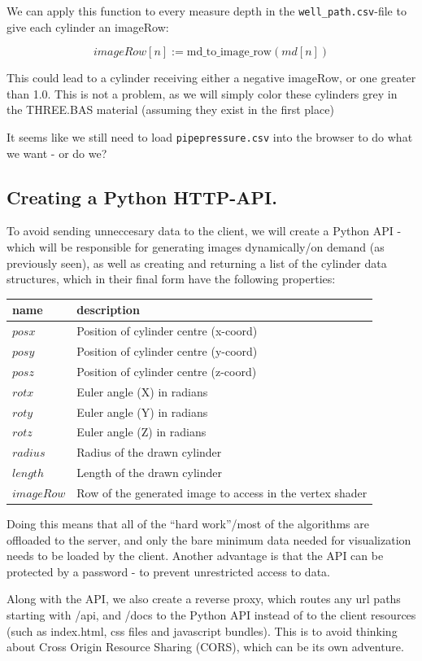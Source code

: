 We can apply this function to every measure depth in the
\texttt{well\_path.csv}-file to give each cylinder an imageRow:

\[
imageRow[n] := \text{md\_to\_image\_row}(md[n])
\]

This could lead to a cylinder receiving either a negative imageRow, or
one greater than 1.0. This is not a problem, as we will simply color
these cylinders grey in the THREE.BAS material (assuming they exist in
the first place)

It seems like we still need to load \texttt{pipepressure.csv} into the
browser to do what we want - or do we?

\hypertarget{creating-a-python-http-api.}{%
\subsection{Creating a Python
HTTP-API.}\label{creating-a-python-http-api.}}

To avoid sending unneccesary data to the client, we will create a Python
API - which will be responsible for generating images dynamically/on
demand (as previously seen), as well as creating and returning a list of
the cylinder data structures, which in their final form have the
following properties:

\begin{longtable}[]{@{}ll@{}}
\toprule
name & description\tabularnewline
\midrule
\endhead
\(posx\) & Position of cylinder centre (x-coord)\tabularnewline
\(posy\) & Position of cylinder centre (y-coord)\tabularnewline
\(posz\) & Position of cylinder centre (z-coord)\tabularnewline
\(rotx\) & Euler angle (X) in radians\tabularnewline
\(roty\) & Euler angle (Y) in radians\tabularnewline
\(rotz\) & Euler angle (Z) in radians\tabularnewline
\(radius\) & Radius of the drawn cylinder\tabularnewline
\(length\) & Length of the drawn cylinder\tabularnewline
\(imageRow\) & Row of the generated image to access in the vertex
shader\tabularnewline
\bottomrule
\end{longtable}

Doing this means that all of the ``hard work''/most of the algorithms
are offloaded to the server, and only the bare minimum data needed for
visualization needs to be loaded by the client. Another advantage is
that the API can be protected by a password - to prevent unrestricted
access to data.

Along with the API, we also create a reverse proxy, which routes any url
paths starting with /api, and /docs to the Python API instead of to the
client resources (such as index.html, css files and javascript bundles).
This is to avoid thinking about Cross Origin Resource Sharing (CORS),
which can be its own adventure.

